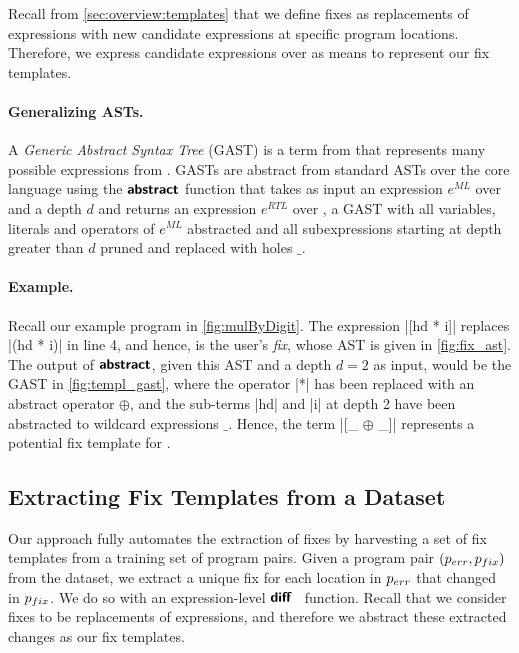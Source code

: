 Recall from \autoref{sec:overview:templates} that we define fixes as
replacements of expressions with new candidate expressions at specific program
locations. Therefore, we express candidate expressions over \repairLang as means
to represent our fix templates. 

\paragraph{Generalizing ASTs.}
A \emph{Generic Abstract Syntax Tree} (GAST) is a term from \repairLang that
represents many possible expressions from \lang. GASTs are abstract from
standard ASTs over the core language \lang using the $\bm{\mathsf{abstract}}$ function that
takes as input an expression $e^{ML}$ over \lang and a depth $d$ and returns an
expression $e^{RTL}$ over \repairLang, \ie a GAST with all variables, literals
and operators of $e^{ML}$ abstracted and all subexpressions starting at depth
greater than $d$ pruned and replaced with holes $\_$.



\paragraph{Example.}
Recall our example program \mbd in \autoref{fig:mulByDigit}.
%
The expression |[hd * i]| replaces |(hd * i)| in line 4, and hence, is the
user's \emph{fix}, whose AST is given in \autoref{fig:fix_ast}.
%
The output of $\bm{\mathsf{abstract}}$, given this AST and a depth $d = 2$ as input, would be
the GAST in \autoref{fig:templ_gast}, where the operator |*| has been replaced
with an abstract operator $\oplus$, and the sub-terms |hd| and |i| at depth 2
have been abstracted to wildcard expressions $\_$.
%
Hence, the \repairLang term |[_ $\oplus$ _]| represents a potential fix template
for \mbd.

\subsection{Extracting Fix Templates from a Dataset}
\label{sec:templ-partition:templates}

Our approach fully automates the extraction of fixes by harvesting a set of fix
templates from a training set of program pairs.
%
Given a program pair $(p_{err}, p_{fix})$ from the dataset, we extract a unique fix
for each location in $p_{err}$ that changed in $p_{fix}$.
%
We do so with an expression-level $\bm{\mathsf{diff}}$~\citep{Lempsink2009-xf} function.
%
Recall that we consider fixes to be replacements of expressions, and
therefore we abstract these extracted changes as our fix templates.

